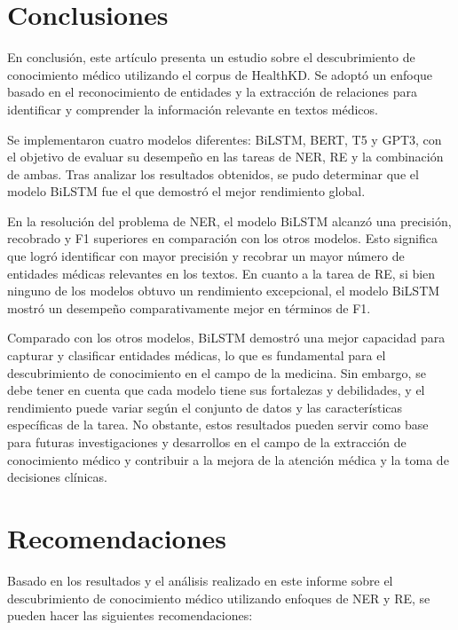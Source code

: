\documentclass[10pt]{article} %
\begin{document}
	\section{Conclusiones}
	
	En conclusión, este art\'iculo presenta un estudio sobre el descubrimiento de conocimiento médico utilizando el corpus de HealthKD. Se adoptó un enfoque basado en el reconocimiento de entidades y la extracción de relaciones para identificar y comprender la información relevante en textos médicos.
	
	Se implementaron cuatro modelos diferentes: BiLSTM, BERT, T5 y GPT3, con el objetivo de evaluar su desempeño en las tareas de NER, RE y la combinación de ambas. Tras analizar los resultados obtenidos, se pudo determinar que el modelo BiLSTM fue el que demostró el mejor rendimiento global.
	
	En la resoluci\'on del problema de NER, el modelo BiLSTM alcanzó una precisión, recobrado y F1 superiores en comparación con los otros modelos. Esto significa que logró identificar con mayor precisión y recobrar un mayor número de entidades médicas relevantes en los textos. En cuanto a la tarea de RE, si bien ninguno de los modelos obtuvo un rendimiento excepcional, el modelo BiLSTM mostró un desempeño comparativamente mejor en términos de F1.
	
	Comparado con los otros modelos, BiLSTM demostró una mejor capacidad para capturar y clasificar entidades médicas, lo que es fundamental para el descubrimiento de conocimiento en el campo de la medicina. Sin embargo, se debe tener en cuenta que cada modelo tiene sus fortalezas y debilidades, y el rendimiento puede variar según el conjunto de datos y las características específicas de la tarea. No obstante, estos resultados pueden servir como base para futuras investigaciones y desarrollos en el campo de la extracción de conocimiento médico y contribuir a la mejora de la atención médica y la toma de decisiones clínicas.
	
	
	

	
	\section{Recomendaciones}
	
	
	Basado en los resultados y el análisis realizado en este informe sobre el descubrimiento de conocimiento médico utilizando enfoques de NER y RE, se pueden hacer las siguientes recomendaciones:
	
\end{document}
